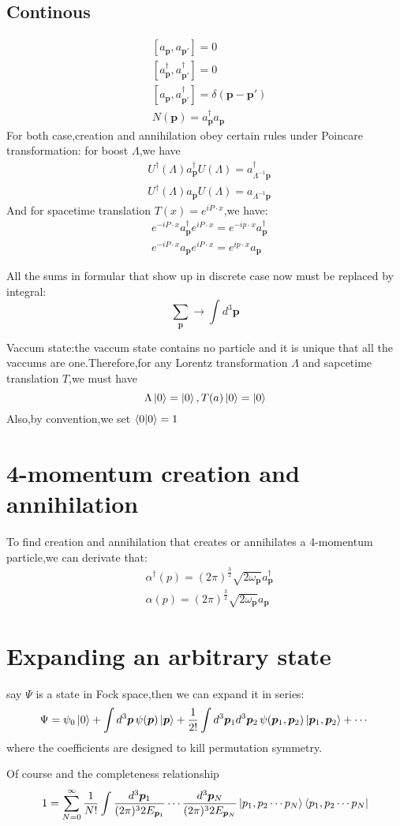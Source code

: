 \documentclass[a4paper]{article}
\begin{document}
\subsection{Continous}
\begin{align*}
	&[a_{\bm{p}},a_{\bm{p}'}]=0\\
	&[a^{\dagger}_{\bm{p}},a^{\dagger}_{\bm{p}'}]=0\\
	&[a_{\bm{p}},a^{\dagger}_{\bm{p}'}]=\delta(\bm{p}-\bm{p}')\\
	&N(\bm{p})=a^{\dagger}_{\bm{p}}a_{\bm{p}}
\end{align*}
For both case,creation and annihilation obey certain rules under Poincare transformation:
for boost $\Lambda$,we have
\begin{align*}
	&U^{\dagger}(\Lambda)a^{\dagger}_{\bm{p}}U(\Lambda)=a^{\dagger}_{\Lambda^{-1}\bm{p}}\\
	&U^{\dagger}(\Lambda)a_{\bm{p}}U(\Lambda)=a_{\Lambda^{-1}\bm{p}}
\end{align*}
And for spacetime translation $T(x)=e^{iP\cdot x}$,we have:
\begin{align*}
	&e^{-iP\cdot x}a^{\dagger}_{\bm{p}}e^{iP\cdot x}=e^{-ip\cdot x}a^{\dagger}_{\bm{p}}\\
	&e^{-iP\cdot x}a_{\bm{p}}e^{iP\cdot x}=e^{ip\cdot x}a_{\bm{p}}
\end{align*}
\par All the sums in formular that show up in discrete case now must be replaced by integral:$$\underset{\bm{p}}{\sum}\rightarrow\int d^3\bm{p}$$
\par Vaccum state:the vaccum state contains no particle and it is unique that all the vaccums are one.Therefore,for any Lorentz transformation $\Lambda$ and sapcetime translation $T$,we must have $$\Lambda\ket{0}=\ket{0},T(a)\ket{0}=\ket{0}$$
Also,by convention,we set $\braket{0|0}=1$
\section{4-momentum creation and annihilation}
To find creation and annihilation that creates or annihilates a 4-momentum particle,we can derivate that:
\begin{align*}
	&\alpha^{\dagger}(p)=(2\pi)^{\frac{3}{2}}\sqrt{2\omega_{\bm{p}}}a^{\dagger}_{\bm{p}}\\
	&\alpha(p)=(2\pi)^{\frac{3}{2}}\sqrt{2\omega_{\bm{p}}}a_{\bm{p}}
\end{align*}
\section{Expanding an arbitrary state}
say $\Psi$ is a state in Fock space,then we can expand it in series:$$\Psi=\psi_0\ket{0}+\int d^3\bm{p}\,\psi(\bm{p})\ket{\bm{p}}+\frac{1}{2!}\int d^3\bm{p}_1 d^3\bm{p}_2\,\psi(\bm{p}_1,\bm{p}_2)\ket{\bm{p}_1,\bm{p}_2}+\cdots
$$where the coefficients are designed to kill permutation symmetry.
\par Of course and the completeness relationship$$1=\sum_{N=0}^{\infty}\frac{1}{N!}\int\frac{d^3\bm{p}_1}{(2\pi)^32E_{\bm{p}_1}}\cdots\frac{d^3\bm{p}_N}{(2\pi)^32E_{\bm{p}_N}}\ket{p_1,p_2\cdots p_N}\bra{p_1,p_2\cdots p_N}$$
\end{document}
